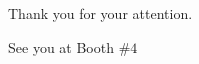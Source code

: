 \documentclass[11pt]{beamer}
\begin{document}
\begin{frame}
\vspace*{-7mm}
 	\begin{center}
		\LARGE Thank you for your attention. \\
	\end{center}
	\vspace*{5mm}
	\begin{center}
		\LARGE See you at {\color{red} Booth $\#4$} \\
	\end{center}
% 	
\end{frame}
\end{document}
